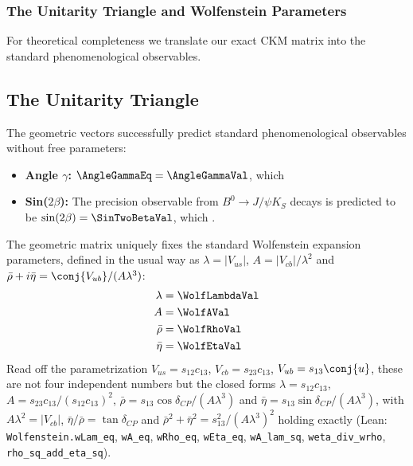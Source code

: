 
\subsubsection{The Unitarity Triangle and Wolfenstein Parameters}

For theoretical completeness we translate our exact CKM matrix into the standard phenomenological observables.

\subsection{The Unitarity Triangle}
The geometric vectors successfully predict standard phenomenological observables without free parameters:
\begin{itemize}
    \item \textbf{Angle $\gamma$:} $\AngleGammaEq = \AngleGammaVal$, which \AngleGammaAccText
    \item \textbf{Sin($2\beta$):} The precision observable from $B^0 \to J/\psi K_S$ decays is predicted to be $\sin(2\beta) = \SinTwoBetaVal$, which \SinTwoBetaAccText.
\end{itemize}

The geometric matrix uniquely fixes the standard Wolfenstein expansion parameters,
defined in the usual way as $\lambda=|V_{us}|$, $A=|V_{cb}|/\lambda^2$ and
$\bar\rho+i\bar\eta=\conj{V_{ub}}/(A\lambda^3)$:
\begin{equation}
\begin{split}
    \lambda &= \WolfLambdaVal \\
    A &= \WolfAVal \\
    \bar{\rho} &= \WolfRhoVal \\
    \bar{\eta} &= \WolfEtaVal
\end{split}
\end{equation}
Read off the parametrization $V_{us}=s_{12}c_{13}$, $V_{cb}=s_{23}c_{13}$,
$V_{ub}=s_{13}\conj{u}$, these are not four independent numbers but the closed
forms $\lambda=s_{12}c_{13}$, $A=s_{23}c_{13}/(s_{12}c_{13})^2$,
$\bar\rho=s_{13}\cos\delta_{CP}/(A\lambda^3)$ and
$\bar\eta=s_{13}\sin\delta_{CP}/(A\lambda^3)$, with
$A\lambda^2=|V_{cb}|$, $\bar\eta/\bar\rho=\tan\delta_{CP}$ and
$\bar\rho^2+\bar\eta^2=s_{13}^2/(A\lambda^3)^2$ holding exactly
(Lean: \texttt{Wolfenstein.wLam\_eq}, \texttt{wA\_eq}, \texttt{wRho\_eq},
\texttt{wEta\_eq}, \texttt{wA\_lam\_sq}, \texttt{weta\_div\_wrho},
\texttt{rho\_sq\_add\_eta\_sq}).

